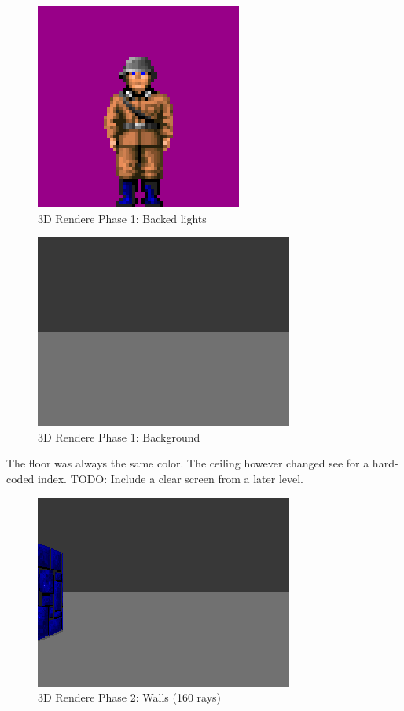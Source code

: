 \documentclass[book.tex]{subfiles}
\begin{document}
  \begin{figure}[H]
\centering
 \includegraphics[scale=1.3]{imgs/guard_sprite.png}
 \caption{3D Rendere Phase 1: Backed lights} \label{fig:backee_lights}
 \end{figure}


\begin{figure}[H]
\centering
 \includegraphics[scale=1.3]{screenshots/wolf3d_1_background.png}
 \caption{3D Rendere Phase 1: Background} \label{fig:mips}
 \end{figure}
The floor was always the same color. The ceiling however changed see  for a hard-coded index. TODO: Include a clear screen from a later level.\\
\begin{figure}[H]
 \centering
  \includegraphics[scale=1.3]{screenshots/wolf3d_4_partial_wall_32rays.png}
  \caption{3D Rendere Phase 2: Walls (160 rays)}
  \label{fig:mips}
\end{figure}
 
\end{document}
